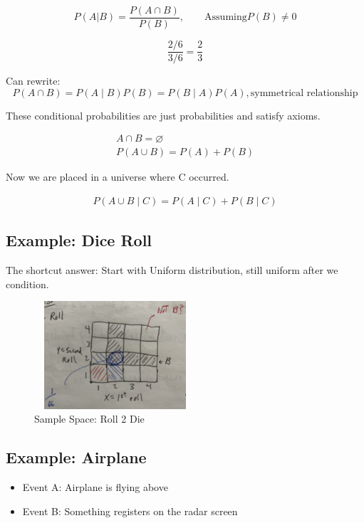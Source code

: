 $$
P(A|B) = \frac{P(A \cap B)}{P(B)}, \qquad \text{Assuming} P(B) \ne 0
$$

$$
\frac{2/6}{3/6} = \frac{2}{3}
$$

 Can rewrite:
$$
P(A \cap B) = P(A \mid B)P(B) = P(B \mid A)P(A), \text{symmetrical relationship} 
$$

 These conditional probabilities are just probabilities and satisfy axioms.

\begin{align*}
A \cap B = \varnothing\\
P(A \cup B) = P(A) + P(B)
\end{align*}

Now we are placed in a universe where C occurred.

\begin{align*}
P(A \cup B \mid C) = P(A \mid C) + P(B \mid C)
\end{align*}

\subsection{Example: Dice Roll}

 The shortcut answer: Start with Uniform distribution, still uniform after we condition.

\begin{figure}[!ht]
\centering
\includegraphics[width=6cm, height=4cm]{images/L02/dice_roll.jpeg}
\caption{Sample Space: Roll 2 Die}
\end{figure}

\subsection{Example: Airplane}


\begin{itemize}
    \item Event A: Airplane is flying above
    \item Event B: Something registers on the radar screen
\end{itemize}

